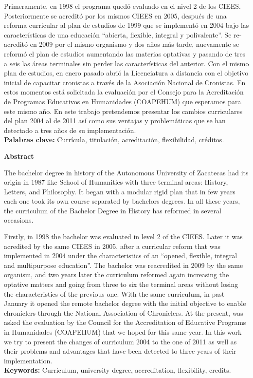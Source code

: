 Primeramente, en 1998 el programa quedó evaluado en el nivel 2 de los 
CIEES. Posteriormente se acreditó por los mismos CIEES en 2005, después 
de una reforma curricular al plan de estudios de 1999 que se implementó 
en 2004 bajo las características de una educación “abierta, flexible, 
integral y polivalente”. Se re-acreditó en 2009 por el mismo organismo 
y dos años más tarde, nuevamente se reformó el plan de estudios 
aumentando las materias optativas y pasando de tres a seis las áreas 
terminales sin perder las características del anterior. Con el mismo 
plan de estudios, en enero pasado abrió la Licenciatura a distancia con 
el objetivo inicial de capacitar cronistas a través de la Asociación 
Nacional de Cronistas. En estos momentos está solicitada la evaluación 
por el Consejo para la Acreditación de Programas Educativos en 
Humanidades (COAPEHUM) que esperamos para este mismo año. En este 
trabajo pretendemos presentar los cambios curriculares del plan 2004 al 
de 2011 así como sus ventajas y problemáticas que se han detectado a 
tres años de su implementación.\\ 
\textbf{Palabras clave:} Currícula, titulación, acreditación, flexibilidad,
créditos.


\bigskip
\textbf{Abstract}

The bachelor degree in history of the Autonomous University of 
Zacatecas had its origin in 1987 like School of Humanities with three 
terminal areas: History, Letters, and Philosophy. It began with a 
modular rigid plan that in few years each one took its own course 
separated by bachelors degrees. In all these years, the curriculum of 
the Bachelor Degree in History has reformed in several occasions.

Firstly, in 1998 the bachelor was evaluated in level 2 of the CIEES. 
Later it was acredited by the same CIEES in 2005, after a curricular 
reform that was implemented in 2004 under the characteristics of an 
“opened, flexible, integral and multipurpose education”.  The bachelor 
was reacredited in 2009 by the same organism, and two years later the 
curriculum reformed again increasing the optative matters and going 
from three to six the terminal areas without losing the characteristics 
of the previous one. With the same curriculum, in past January it 
opened the remote bachelor degree with the initial objective to enable 
chroniclers through the National Association of Chroniclers. At the 
present, was asked the evaluation by the Council for the Accreditation 
of Educative Programs in Humanidades (COAPEHUM) that we hoped for this 
same year. In this work we try to present the changes of curriculum 
2004 to the one of 2011 as well as their problems and advantages that 
have been detected to three years of their implementation.\\
\textbf{Keywords:} Curriculum, university degree,
accreditation, flexibility, credits.

